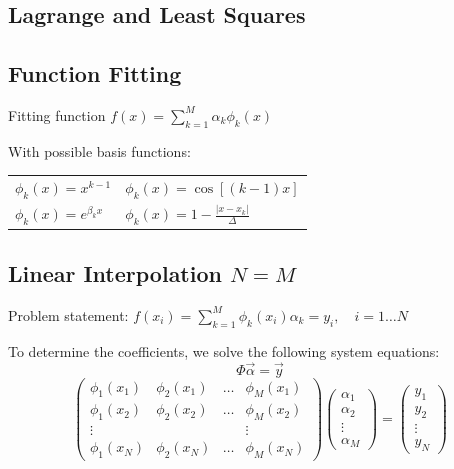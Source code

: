 \documentclass[8pt,a4paper]{scrartcl}
\begin{document}
\setlength{\columnsep}{8mm}
\begin{multicols*}{3}

\section{Lagrange and Least Squares}
\subsection{Function Fitting}

Fitting function $f(x) = \sum_{k=1}^M \alpha_k \phi_k (x) $

With possible basis functions:
\begin{tabular}{|ll|}
\hline
$\phi_k (x) = x ^{k-1} $&$\phi_k (x) = \cos [(k-1)x]$\\
$\phi_k (x) = e^{\beta_k x} $&$\phi_k (x) = 1- \frac{|x - x_k|}{\Delta}$\\
\hline
\end{tabular}

\subsection{Linear Interpolation $N = M$}

Problem statement: $f(x_i) = \sum_{k=1}^M \phi_k (x_i) \alpha_k = y_i, \quad i = 1\dots N$

To determine the coefficients, we solve the following system equations:
\begin{equation*}
\Phi \vec \alpha = \vec y
\end{equation*}
\begin{equation*}
\begin{pmatrix}
\phi_1 (x_1)  & \phi_2 (x_1)  & \dots & \phi_M (x_1)  \\
\phi_1 (x_2)  & \phi_2 (x_2)  & \dots & \phi_M (x_2)  \\
\vdots &  &  & \vdots \\
\phi_1 (x_N)  & \phi_2 (x_N)  & \dots & \phi_M (x_N) 
\end{pmatrix}
\begin{pmatrix}
\alpha_1\\
\alpha_2\\
\vdots \\
\alpha_M
\end{pmatrix}
=
\begin{pmatrix}
y_1\\
y_2\\
\vdots \\
y_N
\end{pmatrix}
\end{equation*}


\end{multicols*}
\end{document}
